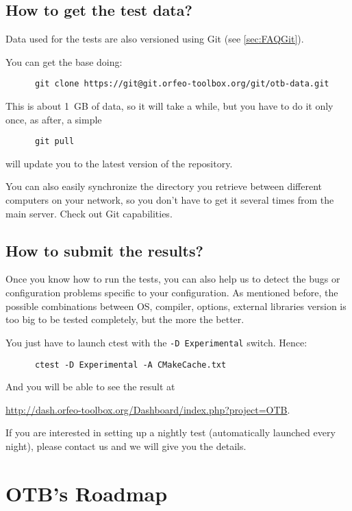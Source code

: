 \subsection{How to get the test data?}\label{sec:FAQTestData}

Data used for the tests are also versioned using Git (see \ref{sec:FAQGit}).

You can get the base doing:
\begin{verbatim}
      git clone https://git@git.orfeo-toolbox.org/git/otb-data.git
\end{verbatim}

This is about 1~GB of data, so it will take a while, but you have to do it only once, as after, a simple
\begin{verbatim}
      git pull
\end{verbatim}
will update you to the latest version of the repository.

You can also easily synchronize the directory you retrieve between different computers on your network, so you don't have to get it several times from the main server. Check out Git capabilities.

\subsection{How to submit the results?}

Once you know how to run the tests, you can also help us to detect the bugs or configuration problems specific to your configuration. As mentioned before, the possible combinations between OS, compiler, options, external libraries version is too big to be tested completely, but the more the better.

You just have to launch ctest with the \texttt{-D Experimental} switch. Hence:
\begin{verbatim}
      ctest -D Experimental -A CMakeCache.txt
\end{verbatim}

And you will be able to see the result at

\url{http://dash.orfeo-toolbox.org/Dashboard/index.php?project=OTB}.

If you are interested in setting up a nightly test (automatically launched every night), please contact us and we will give you the details.

\section{OTB's Roadmap}

